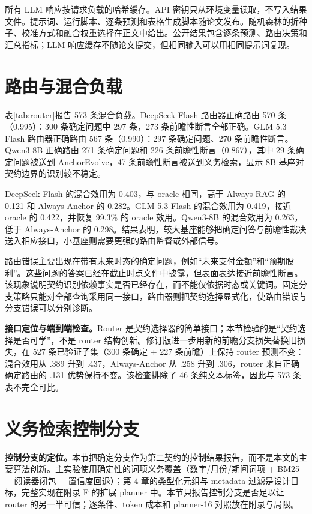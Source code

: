 所有 LLM 响应按请求负载的哈希缓存。API 密钥只从环境变量读取，不写入结果文件。提示词、运行脚本、逐条预测和表格生成脚本随论文发布。随机森林的折种子、校准方式和融合权重选择在正文中给出。公开结果包含逐条预测、路由决策和汇总指标；LLM 响应缓存不随论文提交，但相同输入可以用相同提示词复现。

\section{路由与混合负载}



表\ref{tab:router}报告 573 条混合负载。DeepSeek Flash 路由器正确路由 570 条（0.995）：300 条确定问题中 297 条，273 条前瞻性断言全部正确。GLM 5.3 Flash 路由器正确路由 567 条（0.990）：297 条确定问题、270 条前瞻性断言。Qwen3-8B 正确路由 271 条确定问题和 226 条前瞻性断言（0.867），其中 29 条确定问题被送到 AnchorEvolve，47 条前瞻性断言被送到义务检索，显示 8B 基座对契约边界的识别较不稳定。

DeepSeek Flash 的混合效用为 0.403，与 oracle 相同，高于 Always-RAG 的 0.121 和 Always-Anchor 的 0.282。GLM 5.3 Flash 的混合效用为 0.419，接近 oracle 的 0.422，并恢复 99.3\% 的 oracle 效用。Qwen3-8B 的混合效用为 0.263，低于 Always-Anchor 的 0.298。结果表明，较大基座能够把确定问答与前瞻性裁决送入相应接口，小基座则需要更强的路由监督或外部信号。

路由错误主要出现在带有未来时态的确定问题，例如“未来支付金额”和“预期股利”。这些问题的答案已经在截止时点文件中披露，但表面表达接近前瞻性断言。该现象说明契约识别依赖事实是否已经存在，而不能仅依据时态或关键词。固定分支策略只能对全部查询采用同一接口，路由器则把契约选择显式化，使路由错误与分支错误可以分别诊断。

\begin{revbox}
\noindent\textbf{接口定位与端到端检查。}Router 是契约选择器的简单接口；本节检验的是“契约选择是否可学”，不是 router 结构创新。修订版进一步用新的前瞻分支损失替换旧损失，在 527 条已验证子集（300 条确定 + 227 条前瞻）上保持 router 预测不变：混合效用从 .389 升到 .437，Always-Anchor 从 .258 升到 .306，router 来自正确确定路由的 .131 优势保持不变。该检查排除了 46 条纯文本标签，因此与 573 条表不完全可比。
\end{revbox}

\section{义务检索控制分支}

\begin{revbox}
\noindent\textbf{控制分支的定位。}本节把确定分支作为第二契约的控制结果报告，而不是本文的主要算法创新。主实验使用确定性的词项义务覆盖（数字/月份/期间词项 + BM25 + 阅读器闭包 + 置信度回退）；第 4 章的类型化元组与 metadata 过滤是设计目标，完整实现在附录 F 的扩展 planner 中。本节只报告控制分支是否足以让 router 的另一半可信；逐条件、token 成本和 planner-16 对照放在附录与局限。
\end{revbox}

